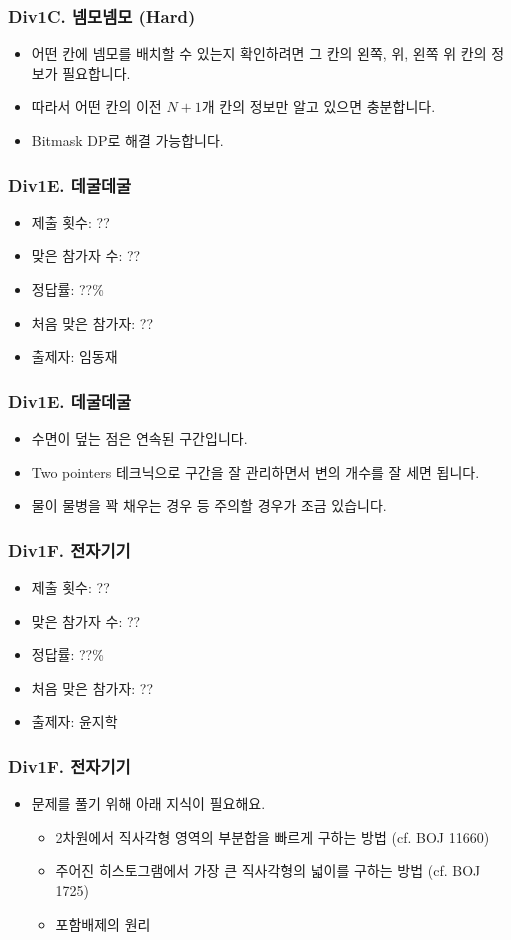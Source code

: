 \documentclass[xetex]{beamer}
\begin{document}
\begin{frame}
  \frametitle{Div1C. 넴모넴모 (Hard)}
  \begin{itemize}
    \item 어떤 칸에 넴모를 배치할 수 있는지 확인하려면 그 칸의 왼쪽, 위, 왼쪽 위 칸의 정보가 필요합니다.
    \item 따라서 어떤 칸의 이전 $N + 1$개 칸의 정보만 알고 있으면 충분합니다.
    \item Bitmask DP로 해결 가능합니다.
  \end{itemize}
\end{frame}

\begin{frame}
  \frametitle{Div1E. 데굴데굴}
  \begin{itemize}
    \item 제출 횟수: ??
    \item 맞은 참가자 수: ??
    \item 정답률: ??\%
    \item 처음 맞은 참가자: ??
    \item 출제자: 임동재
  \end{itemize}
\end{frame}

\begin{frame}
  \frametitle{Div1E. 데굴데굴}
  \begin{itemize}
    \item 수면이 덮는 점은 연속된 구간입니다.
    \item Two pointers 테크닉으로 구간을 잘 관리하면서 변의 개수를 잘 세면 됩니다.
    \item 물이 물병을 꽉 채우는 경우 등 주의할 경우가 조금 있습니다.
  \end{itemize}
\end{frame}

\begin{frame}
  \frametitle{Div1F. 전자기기}
  \begin{itemize}
    \item 제출 횟수: ??
    \item 맞은 참가자 수: ??
    \item 정답률: ??\%
    \item 처음 맞은 참가자: ??
    \item 출제자: 윤지학
  \end{itemize}
\end{frame}

\begin{frame}
  \frametitle{Div1F. 전자기기}
  \begin{itemize}
    \item 문제를 풀기 위해 아래 지식이 필요해요.
    \begin{itemize}
      \item 2차원에서 직사각형 영역의 부분합을 빠르게 구하는 방법 (cf. BOJ 11660)
      \item 주어진 히스토그램에서 가장 큰 직사각형의 넓이를 구하는 방법 (cf. BOJ 1725)
      \item 포함배제의 원리
    \end{itemize}
  \end{itemize}
\end{frame}
\end{document}
